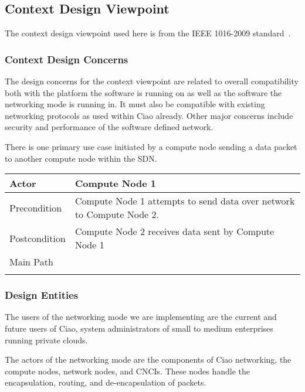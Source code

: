\documentclass[10pt,onecolumn,journal,draftclsnofoot]{IEEEtran}
\newcommand\addrow[2]{#1 &#2\\ }
\newcommand\addheading[2]{#1 &#2\\ \hline}
\newcommand\tabularhead{\begin{tabular}{lp{15cm}}
	\hline
	}
\newcommand\addmulrow[2]{
		\begin{minipage}[t][][t]{2.5cm}#1\end{minipage}%
			&\begin{minipage}[t][][t]{15cm}
				\begin{enumerate} #2   \end{enumerate}
			\end{minipage}\\ }
\newenvironment{usecase}{\tabularhead}
{\hline\end{tabular}}
\begin{document}
\subsection{Context Design Viewpoint}
The context design viewpoint used here is from the IEEE 1016-2009
standard~\cite{ieee1016}.

\subsubsection{Context Design Concerns}

The design concerns for the context viewpoint are related to overall
compatibility both with the platform the software is running on as well as the
software the networking mode is running in. It must also be compatible with
existing networking protocols as used within Ciao already. Other major concerns
include security and performance of the software defined network.

There is one primary use case initiated by a compute node sending a data packet
to another compute node within the SDN.

\begin{usecase}
	\addheading{Actor}{Compute Node 1}
	\addrow{Precondition}{Compute Node 1 attempts to send data over network
	to Compute Node 2.}
	\addrow{Postcondition}{Compute Node 2 receives data sent by Compute Node
	1}
	\addmulrow{Main Path}{
	\item Compute Node 1 encapsulates packet.
	\item Compute Node 1 sends packet to Network Node.
	\item Network Node routes packet via relevant CNCI to Compute Node 2.
	\item Compute Node 2 receives packet and de-encapsulates.\\
	}
\end{usecase}

\subsubsection{Design Entities}

The users of the networking mode we are implementing are the current and future
users of Ciao, system administrators of small to medium enterprises running
private clouds.

The actors of the networking mode are the components of Ciao networking, the
compute nodes, network nodes, and CNCIs. These nodes handle the encapsulation,
routing, and de-encapsulation of packets.
\end{document}
